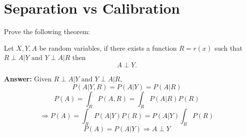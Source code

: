 \section{Separation vs Calibration}
Prove the following theorem:
\begin{theorem}
	Let $X,Y,A $ be random variables, if there exists a function $R = r(x)$ such that
	$
	R \perp A | Y \text{ and }  Y \perp A | R
	$
	then 
	\[
	A \perp Y .
	\]	
\end{theorem}

\textbf{Answer:}
Given $ R \perp A | Y \text{ and }  Y \perp A | R$,
$$ P(A|Y, R) = P(A|Y) = P(A|R) $$
$$ P(A) = \int_R P(A, R) = \int_R P(A|R) P(R) $$
$$ \Rightarrow P(A) = \int_R P(A|Y) P(R) = P(A|Y) \int_R P(R)$$
$$ P(A) = P(A|Y) \Rightarrow A \perp Y  $$

